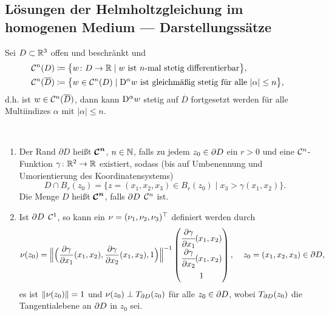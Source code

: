 \setcounter{section}{2}
\setcounter{mydef}{0}
\setcounter{equation}{0}
\subsection{Lösungen der Helmholtzgleichung im homogenen Medium --- Darstellungssätze}

Sei \(D\subset\mathbb{R}^3\) offen und beschränkt und
\begin{align*}
	\mathcal{C}^n(D)&\coloneqq\big\{w\colon D \to \mathbb{R}\mid w\text{ ist }n\text{-mal stetig differentierbar}\big\},\\
	\mathcal{C}^n(\overline{D})&\coloneqq\big\{w\in\mathcal{C}^n(D)\mid \mathrm{D}^\alpha w\text{ ist gleichmäßig stetig für alle }|\alpha|\leq n\big\},
\end{align*}
d.h. ist \(w\in\mathcal{C}^n(\overline{D})\), dann kann \(\mathrm{D}^\alpha w\) stetig auf \(\overline{D}\) fortgesetzt werden für alle Multiindizes \(\alpha\) mit \(|\alpha|\leq n\).
\begin{definition}\label{def: parametrisierung des randes}\
	\begin{enumerate}[label=(\roman*)]
		\item Der Rand \(\partial D\) heißt \(\bm{\mathcal{C}^n}\), \(n\in\mathbb{N}\), falls zu jedem \(z_0\in\partial D\) ein \(r>0\) und eine \(\mathcal{C}^n\)-Funktion \(\gamma\colon\mathbb{R}^2 \to \mathbb{R}\) existiert, sodass (bis auf Umbenennung und Umorientierung des Koordinatensystems)
		\begin{equation*}
			D\cap B_r(z_0)=\{z=(x_1,x_2,x_3)\in B_r(z_0)\mid x_3>\gamma(x_1,x_2)\}.
		\end{equation*}
		Die Menge \(D\) heißt \(\bm{\mathcal{C}^n}\), falls \(\partial D\) \(\mathcal{C}^n\) ist.\vspace{3cm}
		
		
		\item Ist \(\partial D\) \(\mathcal{C}^1\), so kann ein  \(\nu=(\nu_1,\nu_2,\nu_3)^\top\) definiert werden durch
		\begin{equation*}
			\normal(z_0)=\Big\|\Big(\frac{\p\gamma}{\p x_1}(x_1,x_2),\frac{\p\gamma}{\p x_2}(x_1,x_2),1\Big)\Big\|^{-1}
			\begingroup
			\renewcommand*{\arraystretch}{1.5}
			\begin{pmatrix}
				\cfrac{\p\gamma}{\p x_1}(x_1,x_2)\\\cfrac{\p\gamma}{\p x_2}(x_1,x_2)\\1
			\end{pmatrix}
			\endgroup,
			\;\;\;\;z_0=(x_1,x_2,x_3)\in\p D,
		\end{equation*}
		es ist \(\|\nu(z_0)\|=1\) und \(\nu(z_0)\perp T_{\partial D}(z_0)\) für alle \(z_0\in\partial D\), wobei \(T_{\partial D}(z_0)\) die Tangentialebene an \(\partial D\) in \(z_0\) sei.
	\end{enumerate}
\end{definition}
